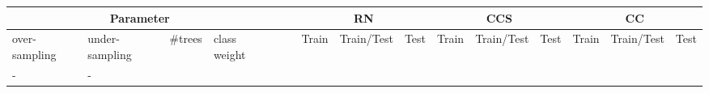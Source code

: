\begin{table}[]
\tiny
\tabcolsep=0.11cm
\begin{tabularx}{\textwidth}{XXlllllllllllll@{}}
\toprule
\multicolumn{4}{c}{Parameter}                                                                                                                                                              & &                                                                     & \multicolumn{3}{c}{RN}                                                                                                                                                                         & \multicolumn{3}{c}{CCS}                                                                                                                                                                           & \multicolumn{3}{c}{CC}                                                                                                                                                                            \\ \midrule
over-\newline sampling                                                       & under-\newline sampling                                                       & \#trees                                                     & class weight          & &                                & Train                                                        & Train/Test                                                        & Test                                                        & Train                                                         & Train/Test                                                         & Test                                                         & Train                                                         & Train/Test                                                         & Test                                                         \\ \midrule
- & - &  &  &                                                              &                                                                   &                                                             &                                                               &                                                                    &                                                              &                                                               &                                                                    &                                                              \\

\end{tabularx}
\end{table}

